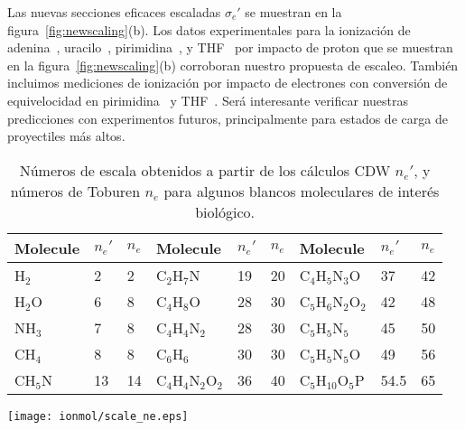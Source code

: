 Las nuevas secciones eficaces escaladas $\sigma_{e}'$ se muestran en la
figura~\ref{fig:newscaling}(b). Los datos experimentales para la 
ionización de adenina~\cite{iriki2011}, uracilo~\cite{itoh2013}, 
pirimidina~\cite{wolff2014}, y THF~\cite{wang2016} por impacto de proton 
que se muestran en la figura~\ref{fig:newscaling}(b) corroboran nuestro
propuesta de escaleo. También incluimos mediciones de ionización por 
impacto de electrones con conversión de equivelocidad en 
pirimidina~\cite{bug2017} y THF~\cite{bug2017,wolf2019,fuss2009}. 
Será interesante verificar nuestras predicciones con experimentos 
futuros, principalmente para estados de carga de proyectiles más altos.

\begin{table}[t]
\begin{center}
\begin{tabular}{|p{}p{}p{}|
p{}p{}p{}|
p{}p{}p{}|}
\hline
 Molecule & $n_e'$ & $n_e$ & Molecule          & $n_e'$ & $n_e$ & Molecule             & $n_e'$ & $n_e$ \\
\hline
 H$_2$    & 2 & 2   & C$_2$H$_7$N         & 19 & 20 & C$_4$H$_5$N$_3$O     & 37 & 42 \\
 H$_2$O   & 6 & 8   & C$_4$H$_8$O         & 28 & 30 & C$_5$H$_6$N$_2$O$_2$ & 42 & 48 \\
 NH$_3$   & 7 & 8   & C$_4$H$_4$N$_2$     & 28 & 30 & C$_5$H$_5$N$_5$      & 45 & 50 \\
 CH$_4$   & 8 & 8   & C$_6$H$_6$          & 30 & 30 & C$_5$H$_5$N$_5$O     & 49 & 56 \\
 CH$_5$N  & 13 & 14 & C$_4$H$_4$N$_2$O$_2$& 36 & 40 & C$_5$H$_{10}$O$_5$P  & 54.5 & 65 \\
 \hline
\end{tabular}
\caption[Números de escala CDW y números de escala de Toburen.]
{Números de escala obtenidos a partir de los cálculos CDW $n_e'$, y 
números de Toburen $n_e$ para algunos blancos moleculares de interés 
biológico.}
\label{nn}
\end{center}
\end{table}

\begin{figure*}[t!]
\centering
\texttt{[image: ionmol/scale\_ne.eps]}
\caption[Sección eficaz de ionización por impacto de protón en términos de
$n_e$.]
{Sección eficaz de ionización por impacto de protón a 0.5, 1,
y 2 MeV en términos del númbero de electrones activos dado por la 
tabla~\ref{nn}. Experimentos: 
\mbox{\Large$\circ$}~adenina~\cite{iriki2011}, 
$\triangle$ uracilo~\cite{itoh2013}, 
$\bigtriangledown$ pirimidina~\cite{wolff2014}, 
$\blacktriangle$ C$_2$H$_7$N, CH$_5$N, metano y amoníaco~\cite{lynch1976},
\mbox{\scriptsize$\bigstar$} amoníaco y H$_2$~\cite{rudd1985}, y 
\mbox{\Large$\bullet$} agua~\cite{luna2007}.}
\label{fig:recta}
\end{figure*}

